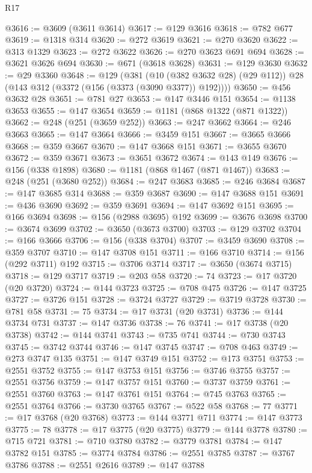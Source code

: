 \begin{lexlean}{R17}
\begin{coremodule}
@3616 := @3609 (@3611 @3614)
@3617 := @129 @3616
@3618 := @782 @677
@3619 := @1318 @314
@3620 := @272 @3619
@3621 := @270 @3620
@3622 := @313 @1329
@3623 := @272 @3622
@3626 := @270 @3623 @691 @694
@3628 := @3621 @3626 @694
@3630 := @671 (@3618 @3628)
@3631 := @129 @3630
@3632 := @29 @3360
@3648 := @129
    (@381
      (@10 (@382 @3632 @28) (@29 @112))
      @28
      (@143 @312 (@3372 (@156 (@3373 (@3090 @3377)) @192))))
@3650 := @456 @3632 @28
@3651 := @781 @27
@3653 := @147 @3446 @151
@3654 := @1138 @3653
@3655 := @147 @3654
@3659 := @1181 (@868 @1322 (@871 @1322))
@3662 := @248 (@251 (@3659 @252))
@3663 := @247 @3662
@3664 := @246 @3663
@3665 := @147 @3664
@3666 := @3459 @151
@3667 := @3665 @3666
@3668 := @359 @3667
@3670 := @147 @3668 @151
@3671 := @3655 @3670
@3672 := @359 @3671
@3673 := @3651 @3672
@3674 := @143 @149
@3676 := @156 (@338 @1898)
@3680 := @1181 (@868 @1467 (@871 @1467))
@3683 := @248 (@251 (@3680 @252))
@3684 := @247 @3683
@3685 := @246 @3684
@3687 := @147 @3685 @314
@3688 := @359 @3687
@3690 := @147 @3688 @151
@3691 := @436 @3690
@3692 := @359 @3691
@3694 := @147 @3692 @151
@3695 := @166 @3694
@3698 := @156 (@2988 @3695) @192
@3699 := @3676 @3698
@3700 := @3674 @3699
@3702 := @3650 (@3673 @3700)
@3703 := @129 @3702
@3704 := @166 @3666
@3706 := @156 (@338 @3704)
@3707 := @3459 @3690
@3708 := @359 @3707
@3710 := @147 @3708 @151
@3711 := @166 @3710
@3714 := @156 (@292 @3711) @192
@3715 := @3706 @3714
@3717 := @3650 (@3674 @3715)
@3718 := @129 @3717
@3719 := @203 @58
@3720 := 74
@3723 := @17 @3720 (@20 @3720)
@3724 := @144 @3723
@3725 := @708 @475
@3726 := @147 @3725
@3727 := @3726 @151
@3728 := @3724 @3727
@3729 := @3719 @3728
@3730 := @781 @58
@3731 := 75
@3734 := @17 @3731 (@20 @3731)
@3736 := @144 @3734 @731
@3737 := @147 @3736
@3738 := 76
@3741 := @17 @3738 (@20 @3738)
@3742 := @144 @3741
@3743 := @735 @741
@3744 := @730 @3743
@3745 := @3742 @3744
@3746 := @147 @3745
@3747 := @708 @463
@3749 := @273 @3747 @135
@3751 := @147 @3749 @151
@3752 := @173 @3751
@3753 := @2551 @3752
@3755 := @147 @3753 @151
@3756 := @3746 @3755
@3757 := @2551 @3756
@3759 := @147 @3757 @151
@3760 := @3737 @3759
@3761 := @2551 @3760
@3763 := @147 @3761 @151
@3764 := @745 @3763
@3765 := @2551 @3764
@3766 := @3730 @3765
@3767 := @522 @58
@3768 := 77
@3771 := @17 @3768 (@20 @3768)
@3773 := @144 @3771 @711
@3774 := @147 @3773
@3775 := 78
@3778 := @17 @3775 (@20 @3775)
@3779 := @144 @3778
@3780 := @715 @721
@3781 := @710 @3780
@3782 := @3779 @3781
@3784 := @147 @3782 @151
@3785 := @3774 @3784
@3786 := @2551 @3785
@3787 := @3767 @3786
@3788 := @2551 @2616
@3789 := @147 @3788

\end{coremodule}
\end{lexlean}
